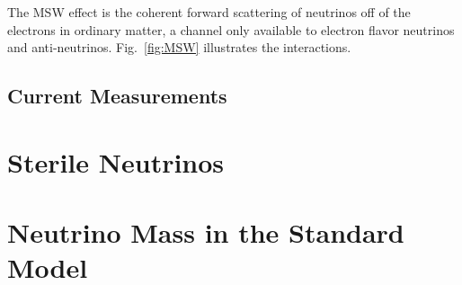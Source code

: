The MSW effect is the coherent forward scattering of neutrinos off of the electrons in ordinary matter, a channel only available to electron flavor neutrinos and anti-neutrinos. Fig.~\ref{fig:MSW} illustrates the interactions.

\subsection{Current Measurements}
\label{sec:BestMeasures}

\section{Sterile Neutrinos}
\label{sec:Theory3+1}

\section{Neutrino Mass in the Standard Model}

